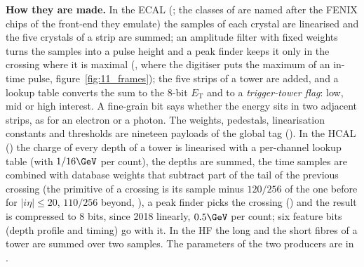 \textbf{How they are made.} In the ECAL (; the classes of
 are named after the FENIX chips of the front-end they emulate) the samples
of each crystal are linearised and the five crystals of a strip are summed; an amplitude filter with fixed weights
turns the samples into a pulse height and a peak finder keeps it only in the crossing where it is maximal
(, where the digitiser puts the maximum of an in-time pulse, figure~\ref{fig:11_frames}); the
five strips of a tower are added, and a lookup table converts the sum to the 8-bit $E_{\mathrm T}$ and to a
\emph{trigger-tower flag}: low, mid or high interest. A fine-grain bit says whether the energy sits in two adjacent
strips, as for an electron or a photon. The weights, pedestals, linearisation constants and thresholds are nineteen
payloads of the global tag (). In the HCAL () the charge of every
depth of a tower is linearised with a per-channel lookup table (with $1/16\GeV$ per count), the depths are summed, the
time samples are combined with database weights that subtract part of the tail of the previous crossing (the
primitive of a crossing is its sample minus $120/256$ of the one before for $|i\eta|\leq20$, $110/256$ beyond,
), a peak finder
picks the crossing () and the result is compressed to 8 bits, since 2018 linearly,
$0.5\GeV$ per count; six feature bits (depth profile and timing) go with it. In the HF the long and the short fibres
of a tower are summed over two samples. The parameters of the two producers are in .

